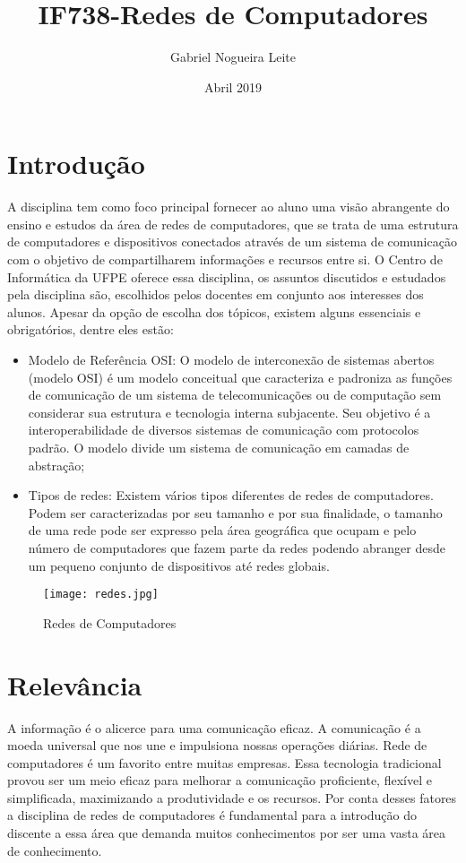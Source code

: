 \documentclass{article}
\title{IF738-Redes de Computadores}
\author{Gabriel Nogueira Leite }
\date{\vspace{-5ex}}
\date{Abril 2019}
\begin{document}
\maketitle

\section{Introdução}
A disciplina tem como foco principal fornecer ao aluno uma visão abrangente do ensino e estudos da área de  redes de computadores, que se trata de uma estrutura de computadores e dispositivos conectados através de um sistema de comunicação com o objetivo de compartilharem informações e recursos entre si. O Centro de Informática da UFPE oferece essa disciplina, os assuntos discutidos e estudados pela disciplina são, escolhidos pelos docentes em conjunto aos interesses dos alunos.
\cite {referenciaDisciplina1, referenciaDisciplina2}
Apesar da opção de escolha dos tópicos, existem alguns essenciais e obrigatórios, dentre eles estão:

\begin{itemize}
   \item Modelo de Referência OSI: O modelo de interconexão de sistemas abertos (modelo OSI) é um modelo conceitual que caracteriza e padroniza as funções de comunicação de um sistema de telecomunicações ou de computação sem considerar sua estrutura e tecnologia interna subjacente.
   \cite{referenciaDisciplina3}
   Seu objetivo é a interoperabilidade de diversos sistemas de comunicação com protocolos padrão. O modelo divide um sistema de comunicação em camadas de abstração;
    \cite {networkWorld}
   \item Tipos de redes: Existem vários tipos diferentes de redes de computadores. Podem ser caracterizadas por seu tamanho e por sua finalidade, o tamanho de uma rede pode ser expresso pela área geográfica que ocupam e pelo número de computadores que fazem parte da redes podendo abranger desde um pequeno conjunto de dispositivos até redes globais.
   \cite{networks}
 \end{itemize}

\begin{figure}[ht]
\centering
\texttt{[image: redes.jpg]}
\caption{Redes de Computadores}
\cite{imagem}
\label{fig: redes.jpg}
\end{figure}

\section{Relevância}
A informação é o alicerce para uma comunicação eficaz. A comunicação é a moeda universal que nos une e impulsiona nossas operações diárias. Rede de computadores é um favorito entre muitas empresas. Essa tecnologia tradicional provou ser um meio eficaz para melhorar a comunicação proficiente, flexível e simplificada, maximizando a produtividade e os recursos.
\cite{networkImportance}
Por conta desses fatores a disciplina de redes de computadores é fundamental para a introdução do discente a essa área que demanda muitos conhecimentos por ser uma vasta área de conhecimento.
\end{document}
